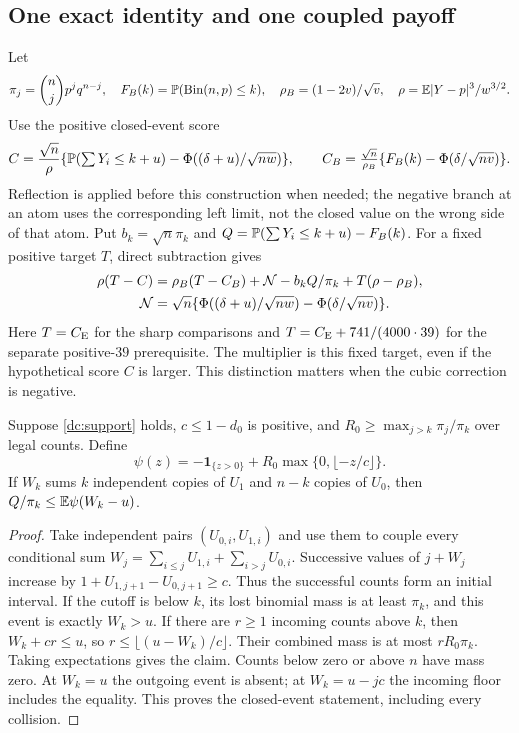 \subsection{One exact identity and one coupled payoff}
\label{dc:identity-section}
Let
\[
 \pi_j=\binom njp^jq^{n-j},\quad F_B(k)=\mathbb P(\operatorname{Bin}(n,p)\le k),
 \quad \rho_B=(1-2v)/\sqrt v,\quad
 \rho=\mathbb E|Y-p|^3/w^{3/2}.
\]
Use the positive closed-event score
\[
 C=\frac{\sqrt n}{\rho}
 \{\mathbb P(\textstyle\sum Y_i\le k+u)-\Phi((\delta+u)/\sqrt{nw})\},
 \qquad C_B=\frac{\sqrt n}{\rho_B}\{F_B(k)-\Phi(\delta/\sqrt{nv})\}.
\]
Reflection is applied before this construction when needed; the negative
branch at an atom uses the corresponding left limit, not the closed value
on the wrong side of that atom. Put $b_k=\sqrt n\pi_k$ and
$Q=\mathbb P(\sum Y_i\le k+u)-F_B(k)$.
For a fixed positive target $T$, direct subtraction gives
\begin{align}\label{dc:target-identity}
 \rho(T-C)={}&\rho_B(T-C_B)+\mathcal N-b_kQ/\pi_k+T(\rho-\rho_B),\\
 \mathcal N={}&\sqrt n\{\Phi((\delta+u)/\sqrt{nw})-
                                      \Phi(\delta/\sqrt{nv})\}.\notag
\end{align}
Here $T=C_{\mathrm E}$ for the sharp comparisons and
$T=C_{\mathrm E}+741/(4000\cdot39)$ for the separate positive-$39$ prerequisite.
The multiplier is this fixed target, even if the hypothetical score $C$
is larger. This distinction matters when the cubic correction is negative.

\begin{lemma}
\label{dc:coupling}
Suppose \eqref{dc:support} holds, $c\le1-d_0$ is positive, and
$R_0\ge\max_{j>k}\pi_j/\pi_k$ over legal counts. Define
\[
 \psi(z)=-\mathbf1_{\{z>0\}}+R_0\max\{0,\lfloor-z/c\rfloor\}.
\]
If $W_k$ sums $k$ independent copies of $U_1$ and $n-k$ copies of $U_0$,
then $Q/\pi_k\le\mathbb E\psi(W_k-u)$.
\end{lemma}
\begin{proof}
Take independent pairs $(U_{0,i},U_{1,i})$ and use them to couple every
conditional sum $W_j=\sum_{i\le j}U_{1,i}+\sum_{i>j}U_{0,i}$.
Successive values of $j+W_j$ increase by
$1+U_{1,j+1}-U_{0,j+1}\ge c$. Thus the successful counts form an
initial interval. If the cutoff is below $k$, its lost binomial mass is
at least $\pi_k$, and this event is exactly $W_k>u$.
If there are $r\ge1$ incoming counts above $k$, then
$W_k+cr\le u$, so $r\le\lfloor(u-W_k)/c\rfloor$.
Their combined mass is at most $rR_0\pi_k$.
Taking expectations gives the claim. Counts below zero or above $n$ have
mass zero. At $W_k=u$ the outgoing event is absent; at
$W_k=u-jc$ the incoming floor includes the equality. This proves the
closed-event statement, including every collision.
\end{proof}


